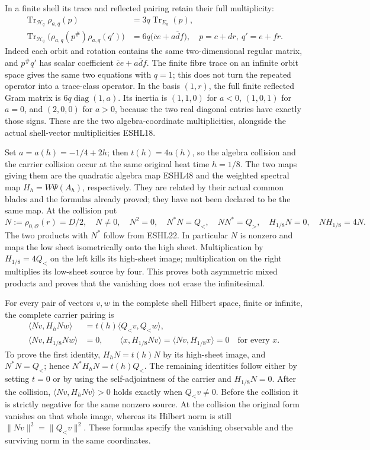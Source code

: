 \documentclass[
  10pt,
  a4paper,
]{article}
\begin{document}
In a finite shell its trace and reflected pairing retain their full
multiplicity: \[
\begin{aligned}
\operatorname{Tr}_{\mathcal H_q}\rho_{a,q}(p)&=3q\operatorname{Tr}_{E_a}(p),\\
\operatorname{Tr}_{\mathcal H_q}\bigl(\rho_{a,q}(p^\#)\rho_{a,q}(q')\bigr)
&=6q\bigl(\overline c e+a\overline d f\bigr),
\quad p=c+dr,\ q'=e+fr.
\end{aligned}
\tag{ESHL50}
\] Indeed each orbit and rotation contains the same two-dimensional
regular matrix, and \(p^\#q'\) has scalar coefficient
\(\overline c e+a\overline d f\). The finite fibre trace on an infinite
orbit space gives the same two equations with \(q=1\); this does not
turn the repeated operator into a trace-class operator. In the basis
\((1,r)\), the full finite reflected Gram matrix is
\(6q\operatorname{diag}(1,a)\). Its inertia is \((1,1,0)\) for \(a<0\),
\((1,0,1)\) for \(a=0\), and \((2,0,0)\) for \(a>0\), because the two
real diagonal entries have exactly those signs. These are the two
algebra-coordinate multiplicities, alongside the actual shell-vector
multiplicities ESHL18.

Set \(a=a(h)=-1/4+2h\); then \(t(h)=4a(h)\), so the algebra collision
and the carrier collision occur at the same original heat time
\(h=1/8\). The two maps giving them are the quadratic algebra map ESHL48
and the weighted spectral map \(H_h=W\Psi(A_h)\), respectively. They are
related by their actual common blades and the formulas already proved;
they have not been declared to be the same map. At the collision put \[
N:=\rho_{0,\mathcal O}(r)=D/2,
\quad N\ne0,\quad N^2=0,\quad
N^*N=Q_<,\quad NN^*=Q_>,\quad
H_{1/8}N=0,\quad NH_{1/8}=4N.
\tag{ESHL51}
\] The two products with \(N^*\) follow from ESHL22. In particular \(N\)
is nonzero and maps the low sheet isometrically onto the high sheet.
Multiplication by \(H_{1/8}=4Q_<\) on the left kills its high-sheet
image; multiplication on the right multiplies its low-sheet source by
four. This proves both asymmetric mixed products and proves that the
vanishing does not erase the infinitesimal.

For every pair of vectors \(v,w\) in the complete shell Hilbert space,
finite or infinite, the complete carrier pairing is \[
\begin{aligned}
\langle Nv,H_hNw\rangle
&=t(h)\langle Q_<v,Q_<w\rangle,\\
\langle Nv,H_{1/8}Nw\rangle&=0,\qquad
\langle x,H_{1/8}Nv\rangle=\langle Nv,H_{1/8}x\rangle=0
\quad\text{for every }x.
\end{aligned}
\tag{ESHL52}
\] To prove the first identity, \(H_hN=t(h)N\) by its high-sheet image,
and \(N^*N=Q_<\); hence \(N^*H_hN=t(h)Q_<\). The remaining identities
follow either by setting \(t=0\) or by using the self-adjointness of the
carrier and \(H_{1/8}N=0\). After the collision,
\(\langle Nv,H_hNv\rangle>0\) holds exactly when \(Q_<v\ne0\). Before
the collision it is strictly negative for the same nonzero source. At
the collision the original form vanishes on that whole image, whereas
its Hilbert norm is still \(\|Nv\|^2=\|Q_<v\|^2\). These formulas
specify the vanishing observable and the surviving norm in the same
coordinates.
\end{document}
